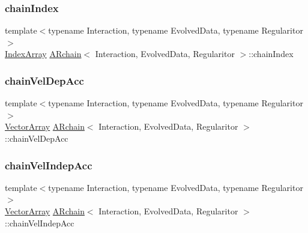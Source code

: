 \mbox{\label{class_a_rchain_a0691e6612b661e329f1fc72d4cb7c895}} 
\subsubsection{\texorpdfstring{chain\+Index}{chainIndex}}
{\footnotesize\ttfamily template$<$typename Interaction, typename Evolved\+Data, typename Regularitor$>$ \\
\mbox{\hyperlink{class_a_rchain_aae40d4b5881eecfc960814f9e368215d}{Index\+Array}} \mbox{\hyperlink{class_a_rchain}{A\+Rchain}}$<$ Interaction, Evolved\+Data, Regularitor $>$\+::chain\+Index\hspace{0.3cm}{\ttfamily [private]}}

\mbox{\label{class_a_rchain_a64087e0cb9cdb6b118b4a6e416d9f012}} 
\subsubsection{\texorpdfstring{chain\+Vel\+Dep\+Acc}{chainVelDepAcc}}
{\footnotesize\ttfamily template$<$typename Interaction, typename Evolved\+Data, typename Regularitor$>$ \\
\mbox{\hyperlink{class_a_rchain_a019fbadb9f4e5892736d9127537338bb}{Vector\+Array}} \mbox{\hyperlink{class_a_rchain}{A\+Rchain}}$<$ Interaction, Evolved\+Data, Regularitor $>$\+::chain\+Vel\+Dep\+Acc\hspace{0.3cm}{\ttfamily [private]}}

\mbox{\label{class_a_rchain_a80d060a3341913f94c4bbbf2e2321b1d}} 
\subsubsection{\texorpdfstring{chain\+Vel\+Indep\+Acc}{chainVelIndepAcc}}
{\footnotesize\ttfamily template$<$typename Interaction, typename Evolved\+Data, typename Regularitor$>$ \\
\mbox{\hyperlink{class_a_rchain_a019fbadb9f4e5892736d9127537338bb}{Vector\+Array}} \mbox{\hyperlink{class_a_rchain}{A\+Rchain}}$<$ Interaction, Evolved\+Data, Regularitor $>$\+::chain\+Vel\+Indep\+Acc\hspace{0.3cm}{\ttfamily [private]}}

